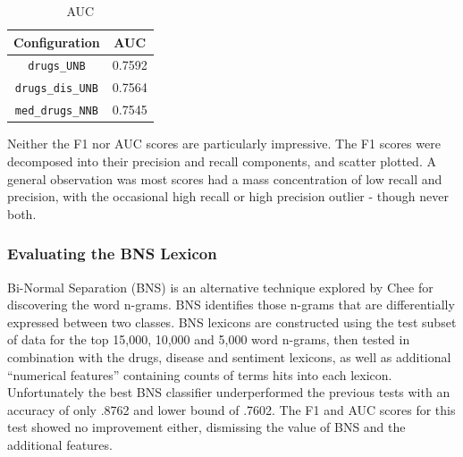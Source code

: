 \documentclass[twoside,11pt]{article}
\begin{document}
\begin{minipage}{.4\textwidth}
  \begin{table}[H]
    \caption{AUC}
    \label{table6}
    \begin{tabular}{||c|c||}
      \hline
      Configuration & AUC \\
      \hline\hline
      \verb|drugs_UNB| & 0.7592 \\
      \hline
      \verb|drugs_dis_UNB| & 0.7564 \\
      \hline
      \verb|med_drugs_NNB| & 0.7545 \\
      \hline
    \end{tabular}
  \end{table}
\end{minipage}

\par Neither the F1 nor AUC scores are particularly impressive. The F1 scores were decomposed into their precision and recall components, and scatter plotted. A general observation was most scores had a mass concentration of low recall and precision, with the occasional high recall or high precision outlier - though never both.

\subsubsection{Evaluating the BNS Lexicon}
Bi-Normal Separation (BNS) is an alternative technique explored by Chee for discovering the word n-grams. BNS identifies those n-grams that are differentially expressed between two classes. BNS lexicons are constructed using the test subset of data for the top 15,000, 10,000 and 5,000 word n-grams, then tested in combination with the drugs, disease and sentiment lexicons, as well as additional ``numerical features'' containing counts of terms hits into each lexicon. Unfortunately the best BNS classifier underperformed the previous tests with an accuracy of only .8762 and lower bound of .7602. The F1 and AUC scores for this test showed no improvement either, dismissing the value of BNS and the additional features.
\end{document}
